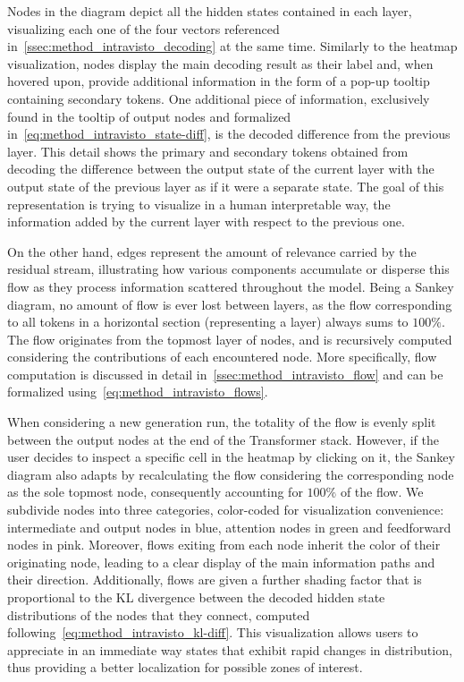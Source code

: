 Nodes in the diagram depict all the hidden states contained in each layer, visualizing each one of the four vectors referenced in~\cref{ssec:method_intravisto_decoding} at the same time.
Similarly to the heatmap visualization, nodes display the main decoding result as their label and, when hovered upon, provide additional information in the form of a pop-up tooltip containing secondary tokens.
One additional piece of information, exclusively found in the tooltip of output nodes and formalized in~\cref{eq:method_intravisto_state-diff}, is the decoded difference from the previous layer.
This detail shows the primary and secondary tokens obtained from decoding the difference between the output state of the current layer with the output state of the previous layer as if it were a separate state.
The goal of this representation is trying to visualize in a human interpretable way, the information added by the current layer with respect to the previous one.

On the other hand, edges represent the amount of relevance carried by the residual stream, illustrating how various components accumulate or disperse this flow as they process information scattered throughout the model.
Being a Sankey diagram, no amount of flow is ever lost between layers, as the flow corresponding to all tokens in a horizontal section (representing a layer) always sums to $100\%$.
The flow originates from the topmost layer of nodes, and is recursively computed considering the contributions of each encountered node.
More specifically, flow computation is discussed in detail in~\cref{ssec:method_intravisto_flow} and can be formalized using~\cref{eq:method_intravisto_flows}.

When considering a new generation run, the totality of the flow is evenly split between the output nodes at the end of the Transformer stack.
However, if the user decides to inspect a specific cell in the heatmap by clicking on it, the Sankey diagram also adapts by recalculating the flow considering the corresponding node as the sole topmost node, consequently accounting for $100\%$ of the flow.
We subdivide nodes into three categories, color-coded for visualization convenience: intermediate and output nodes in blue, attention nodes in green and feedforward nodes in pink.
Moreover, flows exiting from each node inherit the color of their originating node, leading to a clear display of the main information paths and their direction.
Additionally, flows are given a further shading factor that is proportional to the KL divergence between the decoded hidden state distributions of the nodes that they connect, computed following~\cref{eq:method_intravisto_kl-diff}.
This visualization allows users to appreciate in an immediate way states that exhibit rapid changes in distribution, thus providing a better localization for possible zones of interest.


